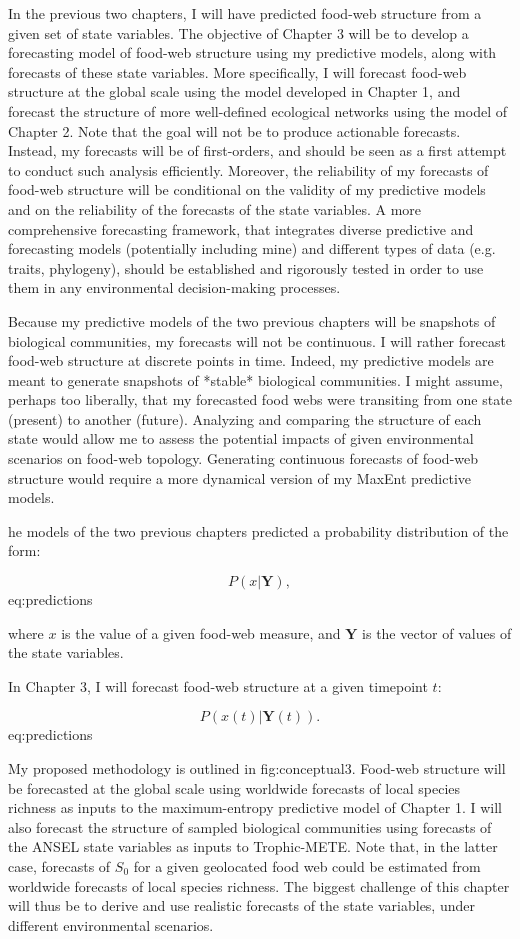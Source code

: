In the previous two chapters, I will have predicted food-web structure from a
given set of state variables. The objective of Chapter 3 will be to develop a
forecasting model of food-web structure using my predictive models, along with
forecasts of these state variables. More specifically, I will forecast food-web
structure at the global scale using the model developed in Chapter 1, and
forecast the structure of more well-defined ecological networks using the model
of Chapter 2. Note that the goal will not be to produce actionable forecasts.
Instead, my forecasts will be of first-orders, and should be seen as a first
attempt to conduct such analysis efficiently. Moreover, the reliability of my
forecasts of food-web structure will be conditional on the validity of my
predictive models and on the reliability of the forecasts of the state
variables. A more comprehensive forecasting framework, that integrates diverse
predictive and forecasting models (potentially including mine) and different
types of data (e.g. traits, phylogeny), should be established and rigorously
tested in order to use them in any environmental decision-making processes.

Because my predictive models of the two previous chapters will be snapshots of
biological communities, my forecasts will not be continuous. I will rather
forecast food-web structure at discrete points in time. Indeed, my predictive
models are meant to generate snapshots of *stable* biological communities. I
might assume, perhaps too liberally, that my forecasted food webs were
transiting from one state (present) to another (future). Analyzing and comparing
the structure of each state would allow me to assess the potential impacts of
given environmental scenarios on food-web topology. Generating continuous
forecasts of food-web structure would require a more dynamical version of my
MaxEnt predictive models.

he models of the two previous chapters predicted a probability distribution of
the form:

$$P(x|\textbf{Y}),$${eq:predictions}

where $x$ is the value of a given food-web measure, and $\textbf{Y}$ is the
vector of values of the state variables.

In Chapter 3, I will forecast food-web structure at a given timepoint $t$:

$$P(x(t)|\textbf{Y}(t)).$${eq:predictions}

My proposed methodology is outlined in fig:conceptual3. Food-web structure will
be forecasted at the global scale using worldwide forecasts of local species
richness as inputs to the maximum-entropy predictive model of Chapter 1. I will
also forecast the structure of sampled biological communities using forecasts of
the ANSEL state variables as inputs to Trophic-METE. Note that, in the latter
case, forecasts of $S_0$ for a given geolocated food web could be estimated from
worldwide forecasts of local species richness. The biggest challenge of this
chapter will thus be to derive and use realistic forecasts of the state
variables, under different environmental scenarios.

